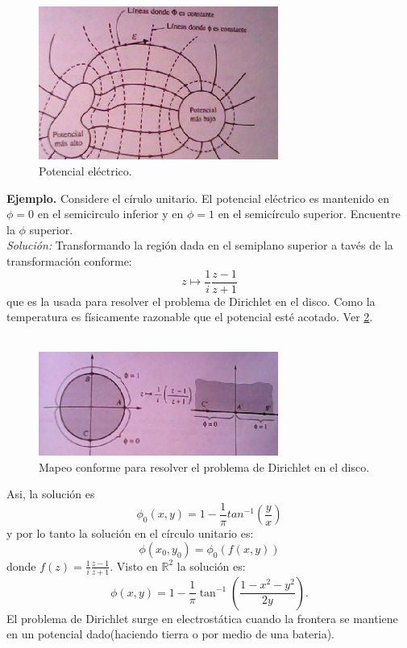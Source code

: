 \documentclass[a4paper]{article}
\begin{document}
\begin{figure}
\centering
\includegraphics[width=0.7\textwidth]{electrico.jpg}
\caption{\label{fig:electrico} Potencial eléctrico.}
\end{figure}

\textbf{Ejemplo.} Considere el círulo unitario. El potencial eléctrico es mantenido en $\phi=0$ en el semicirculo inferior y en $\phi=1$ en el semicírculo superior. Encuentre la $\phi$ superior.\\
\textit{Solución:} Transformando la región dada en el semiplano superior a tavés de la transformación conforme: $$
z \mapsto \frac{1}{i} \frac{z-1}{z+1}
$$ que es la usada para resolver el problema de Dirichlet en el disco.
Como la temperatura es físicamente razonable que el potencial esté acotado. Ver \ref{fig:Dirichlet}.\\\\
\begin{figure}
\centering
\includegraphics[width=0.7\textwidth]{Dirichlet.jpg}
\caption{\label{fig:Dirichlet} Mapeo conforme para resolver el problema de Dirichlet en el disco.}
\end{figure}

Asi, la solución es $$
\phi_{0}(x,y)=1-\frac{1}{\pi}tan^{-1}(\frac{y}{x})
$$ y por lo tanto la solución en el círculo unitario es:
$$
\phi(x_{0}, y_{0})=\phi_{0}(f(x, y))
$$ donde $f(z)=\frac{1}{i} \frac{z-1}{z+1}.$ Visto en $\mathbb{R}^{2}$ la solución es:$$
\phi(x,y)=1-\frac{1}{\pi} \tan^{-1}(\frac{1-x^{2}-y^{2}}{2y}).
$$
El problema de Dirichlet surge en electrostática cuando la frontera se mantiene en un potencial dado(haciendo tierra o por medio de una bateria).\\
\end{document}
